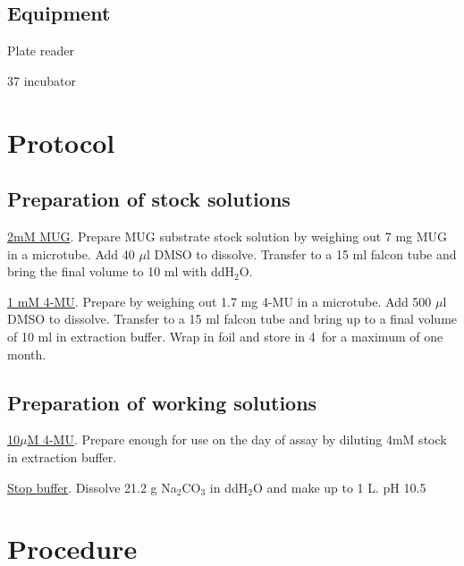 	\subsection{Equipment}
	\begin{packed_enum}
	\item Plate reader
	\item 37 {\textcelsius} incubator
	\end{packed_enum}
 
\section{Protocol}
	\subsection{Preparation of stock solutions}
	\begin{packed_enum}
	\item {\underline{2mM MUG}}. Prepare MUG substrate stock solution by weighing out 7 mg MUG in a microtube. Add 40 $\mu$l DMSO to dissolve. Transfer to a 15 ml falcon tube and bring the final volume to 10 ml with ddH$_{2}$O.
	\item \underline{1 mM 4-MU}. Prepare by weighing out 1.7 mg 4-MU in a microtube. Add 500 $\mu$l DMSO to dissolve. Transfer to a 15 ml falcon tube and bring up to a final volume of 10 ml in extraction buffer. Wrap in foil and store in 4\textcelsius\ for a maximum of one month.
	\end{packed_enum}
	\subsection{Preparation of working solutions}
	\begin{packed_enum}
		\item {\underline{10$\mu$M 4-MU}}. Prepare enough for use on the day of assay by diluting 4mM stock in extraction buffer.
		\item {\underline{Stop buffer}}. Dissolve 21.2 g Na$_{2}$CO$_{3}$ in ddH$_{2}$O and make up to 1 L. pH 10.5
	\end{packed_enum}
\section{Procedure}
	


